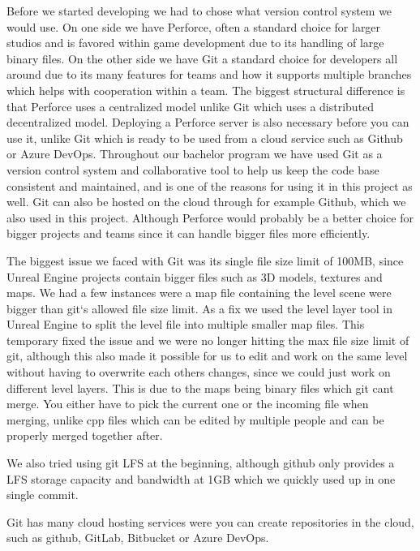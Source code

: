 Before we started developing we had to chose what version control system we would use. On one side we have Perforce, often a standard choice for larger studios and is favored within game development due to its handling of large binary files. On the other side we have Git a standard choice for developers all around due to its many features for teams and how it supports multiple branches which helps with cooperation within a team. The biggest structural difference is that Perforce uses a centralized model unlike Git which uses a distributed decentralized model. Deploying a Perforce server is also necessary before you can use it, unlike Git which is ready to be used from a cloud service such as Github or Azure DevOps. 
Throughout our bachelor program we have used Git as a version control system and collaborative tool to help us keep the code base consistent and maintained, and is one of the reasons for using it in this project as well. Git can also be hosted on the cloud through for example Github, which we also used in this project. Although Perforce would probably be a better choice for bigger projects and teams since it can handle bigger files more efficiently\cite{different_version_control_used_in_gamedev}.

The biggest issue we faced with Git was its single file size limit of 100MB, since Unreal Engine projects contain bigger files such as 3D models, textures and maps. We had a few instances were a map file containing the level scene were bigger than git`s allowed file size limit. As a fix we used the level layer tool in Unreal Engine to split the level file into multiple smaller map files. This temporary fixed the issue and we were no longer hitting the max file size limit of git, although this also made it possible for us to edit and work on the same level without having to overwrite each others changes, since we could just work on different level layers. This is due to the maps being binary files which git cant merge. You either have to pick the current one or the incoming file when merging, unlike cpp files which can be edited by multiple people and can be properly merged together after. 

We also tried using git LFS at the beginning, although \Gls{github} only provides a LFS storage capacity and bandwidth at 1GB which we quickly used up in one single commit. 

Git has many cloud hosting services were you can create repositories in the cloud, such as \Gls{github}, GitLab, Bitbucket or Azure DevOps.

